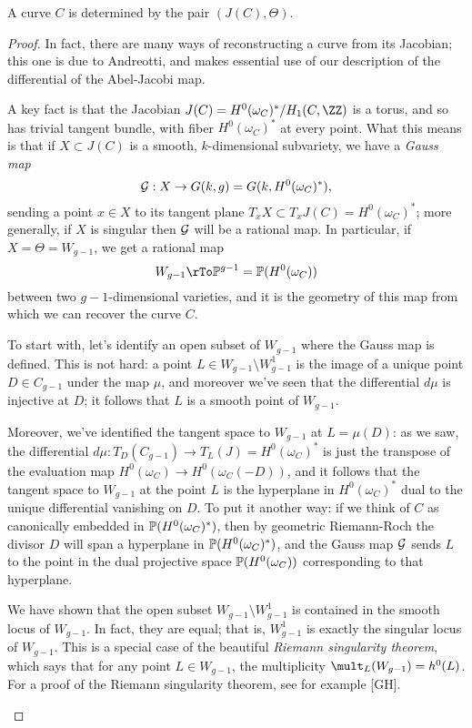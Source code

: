 \begin{theorem}[Torelli]
A curve $C$ is determined by the pair $(J(C), \Theta)$.
\end{theorem}

\begin{proof}
In fact, there are many ways of reconstructing a curve from its Jacobian; this one is  due to Andreotti, and makes essential use of our description of the differential of the Abel-Jacobi map. 

A key  fact is that the Jacobian $J(C) = H^0(\omega_C)^*/H_1(C,\ZZ)$ is a torus, and so has trivial tangent bundle, with fiber $H^0(\omega_C)^*$ at every point. What this means is that if $X \subset J(C)$ is a smooth, $k$-dimensional subvariety, we have a \emph{Gauss map}
$$
\cG : X \to G(k, g) = G(k, H^0(\omega_C)^*),
$$
sending a point $x \in X$ to its tangent plane $T_xX \subset T_xJ(C) = H^0(\omega_C)^*$; more generally, if $X$ is singular then $\cG$ will be a rational map. In particular, if $X = \Theta = W_{g-1}$, we get a rational map
$$
W_{g-1} \rTo \PP^{g-1} = \PP(H^0(\omega_C))
$$
between two $g-1$-dimensional varieties, and it is the geometry of this map from which we can recover the curve $C$.

To start with, let's identify an open subset of $W_{g-1}$ where the Gauss map is defined. This is not hard: a point $L \in W_{g-1} \setminus W^1_{g-1}$ is the image of a unique point $D \in C_{g-1}$ under the map $\mu$, and moreover we've seen that the differential $d\mu$ is injective at $D$; it follows that $L$ is a smooth point of $W_{g-1}$. 

Moreover, we've identified the tangent space to $W_{g-1}$ at $L = \mu(D)$: as we saw, the differential $d\mu : T_D(C_{g-1}) \to T_L(J) = H^0(\omega_C)^*$ is just the transpose of the evaluation map $H^0(\omega_C) \to H^0(\omega_C(-D))$, and it follows that the tangent space to $W_{g-1}$ at the point $L$ is the hyperplane in $H^0(\omega_C)^*$ dual to the unique differential vanishing on $D$. To put it another way: if we think of $C$ as canonically embedded in $\PP(H^0(\omega_C)^*)$, then by geometric Riemann-Roch the divisor $D$ will span a hyperplane in $\PP(H^0(\omega_C)^*)$, and the Gauss map $\cG$ sends $L$ to the point in the dual projective space $\PP(H^0(\omega_C))$ corresponding to that hyperplane.

\begin{fact}
We have shown that the open subset $W_{g-1} \setminus W^1_{g-1}$ is contained in the smooth locus of $W_{g-1}$. In fact, they are equal; that is, $W^1_{g-1}$ is exactly the singular locus of $W_{g-1}$. This is a special case of the beautiful \emph{Riemann singularity theorem}, which says that for any point $L \in W_{g-1}$, the multiplicity $\mult_L(W_{g-1}) = h^0(L)$. For a proof of the Riemann singularity theorem, see for example [GH]. 
\end{fact}


\end{proof}
